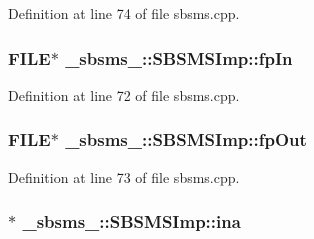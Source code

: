 Definition at line 74 of file sbsms.\+cpp.

\subsubsection[{\texorpdfstring{fp\+In}{fpIn}}]{\setlength{\rightskip}{0pt plus 5cm}F\+I\+LE$\ast$ \+\_\+sbsms\+\_\+\+::\+S\+B\+S\+M\+S\+Imp\+::fp\+In\hspace{0.3cm}{\ttfamily [protected]}}\hypertarget{class__sbsms___1_1_s_b_s_m_s_imp_a5fe7b904d708d2b56f08d64443cd94e9}{}\label{class__sbsms___1_1_s_b_s_m_s_imp_a5fe7b904d708d2b56f08d64443cd94e9}


Definition at line 72 of file sbsms.\+cpp.

\subsubsection[{\texorpdfstring{fp\+Out}{fpOut}}]{\setlength{\rightskip}{0pt plus 5cm}F\+I\+LE$\ast$ \+\_\+sbsms\+\_\+\+::\+S\+B\+S\+M\+S\+Imp\+::fp\+Out\hspace{0.3cm}{\ttfamily [protected]}}\hypertarget{class__sbsms___1_1_s_b_s_m_s_imp_a494f8877f2cdb66b9412430c55229fd3}{}\label{class__sbsms___1_1_s_b_s_m_s_imp_a494f8877f2cdb66b9412430c55229fd3}


Definition at line 73 of file sbsms.\+cpp.

\subsubsection[{\texorpdfstring{ina}{ina}}]{$\ast$ \+\_\+sbsms\+\_\+\+::\+S\+B\+S\+M\+S\+Imp\+::ina\hspace{0.3cm}{\ttfamily [protected]}}\hypertarget{class__sbsms___1_1_s_b_s_m_s_imp_a9ccb8d9d7c918add37972c40d1eaa51c}{}\label{class__sbsms___1_1_s_b_s_m_s_imp_a9ccb8d9d7c918add37972c40d1eaa51c}


